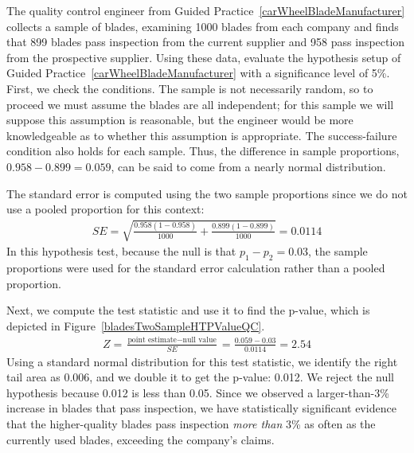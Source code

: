 \setlength{\captionwidth}{\mycaptionwidth}


\begin{examplewrap}
\begin{nexample}{The quality control engineer from
    Guided Practice~\ref{carWheelBladeManufacturer}
    collects a sample of blades, examining 1000 blades
    from each company and finds that 899 blades pass
    inspection from the current supplier and 958 pass
    inspection from the prospective supplier.
    Using these data, evaluate the hypothesis setup of
    Guided Practice~\ref{carWheelBladeManufacturer}
    with a significance level of 5\%.}
  \label{qualityCtrlEngHypothesisEval}%
  First, we check the conditions.
  The sample is not necessarily random, so to proceed
  we must assume the blades are all independent;
  for this sample we will suppose this assumption
  is reasonable, but the engineer would be more knowledgeable
  as to whether this assumption is appropriate.
  The success-failure condition also holds for each sample.
  Thus, the difference in sample proportions,
  $0.958 - 0.899 = 0.059$, can be said to come from a nearly
  normal distribution.

  The standard error is computed using the two sample
  proportions since we do not use a pooled proportion
  for this context:
  \begin{align*}
  SE
    = \sqrt{\frac{0.958(1-0.958)}{1000} +
        \frac{0.899(1-0.899)}{1000}}
    = 0.0114
  \end{align*}
  In this hypothesis test, because the null is that
  $p_1 - p_2 = 0.03$, the sample proportions were used
  for the standard error calculation rather than a pooled
  proportion.

  Next, we compute the test statistic and use it to find the
  p-value, which is depicted in
  Figure~\ref{bladesTwoSampleHTPValueQC}.
  \begin{align*}
  Z = \frac{\text{point estimate} - \text{null value}}{SE}
    = \frac{0.059 - 0.03}{0.0114} = 2.54
  \end{align*}
  Using a standard normal distribution for this test statistic,
  we identify the right tail area as 0.006,
  and we double it to get the p-value: 0.012.
  We reject the null hypothesis because 0.012 is less than 0.05.
  Since we observed a larger-than-3\% increase in blades
  that pass inspection, we have statistically significant
  evidence that the higher-quality blades pass inspection
  \emph{more than} 3\% as often as the currently used blades,
  exceeding the company's claims.
\end{nexample}
\end{examplewrap}

